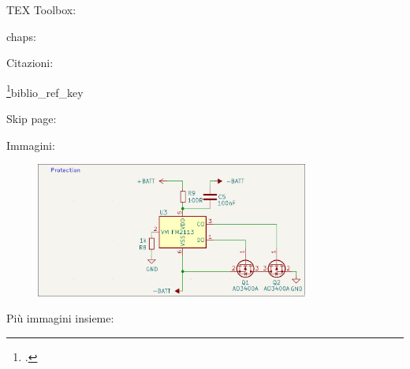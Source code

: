 TEX Toolbox:

chaps:
\label{chap:intro}
\label{chap:firegex}
\label{chap:ctfad}
\label{chap:nfproxy}
\label{chap:tests}
\label{chap:notes}
\label{chap:ending}

Citazioni:

\cite{riscv}
\footcite{Small description}{biblio_ref_key}

Skip page:

\vspace{\fill}
\newpage

Immagini:

\begin{figure}[H]
  \centering
  \includegraphics[width=0.8\textwidth]{images/chapter2/protection.png}
\end{figure}

Più immagini insieme:

